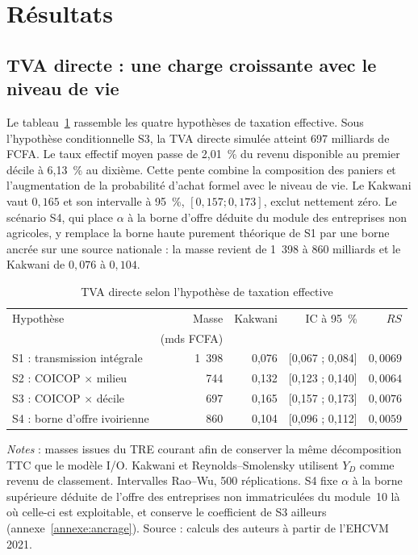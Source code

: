 \documentclass[11pt,a4paper]{article}
\begin{document}
\section{Résultats}
\label{sec:resultats}

\subsection{TVA directe : une charge croissante avec le niveau de vie}

Le tableau~\ref{tab:vat-scenarios} rassemble les quatre hypothèses de taxation
effective. Sous l'hypothèse conditionnelle S3, la TVA directe simulée atteint 697
milliards de FCFA. Le taux effectif moyen passe de 2,01~\% du revenu disponible
au premier décile à 6,13~\% au dixième. Cette pente combine la composition des
paniers et l'augmentation de la probabilité d'achat formel avec le niveau de
vie. Le Kakwani vaut $0,165$ et son intervalle à 95~\%, $[0,157;0,173]$, exclut
nettement zéro. Le scénario S4, qui place $\alpha$ à la borne d'offre déduite du
module des entreprises non agricoles, y remplace la borne haute purement
théorique de S1 par une borne ancrée sur une source nationale : la masse revient
de 1~398 à 860 milliards et le Kakwani de $0,076$ à $0,104$.

\begin{table}[t]
\centering
\begin{threeparttable}
\caption{TVA directe selon l'hypothèse de taxation effective}
\label{tab:vat-scenarios}
\begin{tabular}{lrrrr}
\toprule
Hypothèse & Masse & Kakwani & IC à 95~\% & $RS$ \\
           & (mds FCFA) & & & \\
\midrule
S1 : transmission intégrale & 1~398 & 0,076 & [0,067 ; 0,084] & $0,0069$ \\
S2 : COICOP $\times$ milieu &   744 & 0,132 & [0,123 ; 0,140] & $0,0064$ \\
S3 : COICOP $\times$ décile &   697 & 0,165 & [0,157 ; 0,173] & $0,0076$ \\
S4 : borne d'offre ivoirienne &   860 & 0,104 & [0,096 ; 0,112] & $0,0059$ \\
\bottomrule
\end{tabular}
\begin{tablenotes}\footnotesize
\item \emph{Notes} : masses issues du TRE courant afin de conserver la même
décomposition TTC que le modèle I/O. Kakwani et Reynolds--Smolensky utilisent
$Y_D$ comme revenu de classement. Intervalles Rao--Wu, 500 réplications.
S4 fixe $\alpha$ à la borne supérieure déduite de l'offre des entreprises non
immatriculées du module~10 là où celle-ci est exploitable, et conserve le
coefficient de S3 ailleurs (annexe~\ref{annexe:ancrage}).
Source : calculs des auteurs à partir de l'EHCVM 2021.
\end{tablenotes}
\end{threeparttable}
\end{table}
\end{document}

